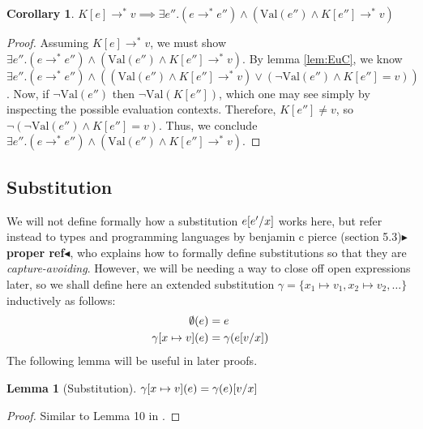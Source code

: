 \documentclass[twoside,11pt,openright]{report}
\newtheorem{corollary}{Corollary}[theorem]
\newtheorem{lemma}[theorem]{Lemma}
\theoremstyle{definition}
\newcommand{\var}{x}
\newcommand{\expr}{e}
\newcommand{\val}{v}
\newcommand{\elctx}{K}
\newcommand{\subst}[3]{#1{\left[#3 \middle/ #2 \right]}}
\newcommand{\stepS}{\rightarrow^*}
\newcommand{\Val}[1]{\mathrm{Val}(#1)}
\newcommand{\map}[2]{#1 \mapsto #2}
\newcommand{\todo}[1]{{\color[rgb]{.5,0,0}\textbf{$\blacktriangleright$#1$\blacktriangleleft$}}}
\begin{document}
\begin{corollary}\label{cor:EuC_val}
  $\elctx[\expr] \stepS \val \implies \exists \expr'' . (\expr \stepS \expr'') \land (\Val{\expr''} \land \elctx[\expr''] \stepS \val)$
\end{corollary}
\begin{proof}
  Assuming $\elctx[\expr] \stepS \val$, we must show $\exists \expr'' . (\expr \stepS \expr'') \land (\Val{\expr''} \land \elctx[\expr''] \stepS \val)$.
  By lemma \ref*{lem:EuC}, we know $\exists \expr'' . (\expr \stepS \expr'') \land ((\Val{\expr''} \land \elctx[\expr''] \stepS \val) \lor
  (\neg \Val{\expr''} \land \elctx[\expr''] = \val))$. Now, if $\neg \Val{\expr''}$ then $\neg \Val{\elctx[\expr'']}$, which one may see simply by inspecting the possible evaluation contexts. Therefore, $\elctx[\expr''] \neq \val$, so $\neg(\neg \Val{\expr''} \land \elctx[\expr''] = \val)$. Thus, we conclude $\exists \expr'' . (\expr \stepS \expr'') \land (\Val{\expr''} \land \elctx[\expr''] \stepS \val)$.
\end{proof}

\subsection{Substitution}
We will not define formally how a substitution $\subst{\expr}{\var}{\expr'}$ works here, but refer instead to types and programming languages by benjamin c pierce (section 5.3)\todo{proper ref}, who explains how to formally define substitutions so that they are \textit{capture-avoiding}. However, we will be needing a way to close off open expressions later, so we shall define here an extended substitution $\gamma = \{\map{\var_1}{\val_1}, \map{\var_2}{\val_2}, \dots\}$ inductively as follows:
\begin{align*}
  \emptyset(\expr) &= \expr\\
  \gamma[\map{\var}{\val}](\expr) &= \gamma(\subst{\expr}{\var}{\val})
\end{align*}
The following lemma will be useful in later proofs.
\begin{lemma}[Substitution]\label{lem:sub}
  $\gamma[\map{\var}{\val}](\expr) = \subst{\gamma(\expr)}{\var}{\val}$
\end{lemma}
\begin{proof}
  Similar to Lemma 10 in \cite{DBLP:journals/corr/abs-1907-11133}.
\end{proof}
\end{document}
